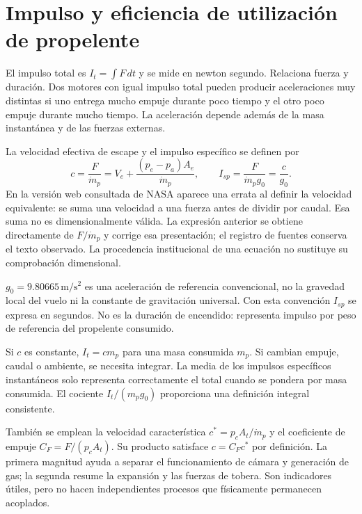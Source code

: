 \section{Impulso y eficiencia de utilización de propelente}
El impulso total es $I_t=\int F\,dt$ y se mide en newton segundo. Relaciona fuerza y duración. Dos motores con igual impulso total pueden producir aceleraciones muy distintas si uno entrega mucho empuje durante poco tiempo y el otro poco empuje durante mucho tiempo. La aceleración depende además de la masa instantánea y de las fuerzas externas.

La velocidad efectiva de escape y el impulso específico se definen por
\begin{equation}
 c=\frac{F}{\dot m_p}=V_e+\frac{(p_e-p_a)A_e}{\dot m_p},
 \qquad I_{sp}=\frac{F}{\dot m_p g_0}=\frac{c}{g_0}.
\end{equation}
En la versión web consultada de NASA aparece una errata al definir la velocidad equivalente: se suma una velocidad a una fuerza antes de dividir por caudal. Esa suma no es dimensionalmente válida. La expresión anterior se obtiene directamente de $F/\dot m_p$ y corrige esa presentación; el registro de fuentes conserva el texto observado. La procedencia institucional de una ecuación no sustituye su comprobación dimensional.

$g_0=9.80665\,\mathrm{m/s^2}$ es una aceleración de referencia convencional, no la gravedad local del vuelo ni la constante de gravitación universal. Con esta convención $I_{sp}$ se expresa en segundos. No es la duración de encendido: representa impulso por peso de referencia del propelente consumido.

Si $c$ es constante, $I_t=cm_p$ para una masa consumida $m_p$. Si cambian empuje, caudal o ambiente, se necesita integrar. La media de los impulsos específicos instantáneos solo representa correctamente el total cuando se pondera por masa consumida. El cociente $I_t/(m_pg_0)$ proporciona una definición integral consistente.

También se emplean la velocidad característica $c^*=p_cA_t/\dot m_p$ y el coeficiente de empuje $C_F=F/(p_cA_t)$. Su producto satisface $c=C_Fc^*$ por definición. La primera magnitud ayuda a separar el funcionamiento de cámara y generación de gas; la segunda resume la expansión y las fuerzas de tobera. Son indicadores útiles, pero no hacen independientes procesos que físicamente permanecen acoplados.


